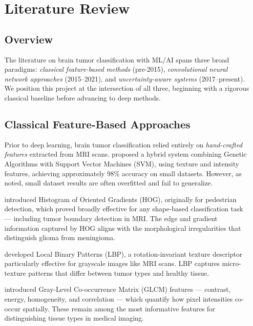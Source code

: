 \documentclass[12pt,a4paper]{article}
\begin{document}
\section{Literature Review}

\subsection{Overview}

The literature on brain tumor classification with ML/AI spans three broad paradigms: \textit{classical feature-based methods} (pre-2015), \textit{convolutional neural network approaches} (2015--2021), and \textit{uncertainty-aware systems} (2017--present). We position this project at the intersection of all three, beginning with a rigorous classical baseline before advancing to deep methods.

\subsection{Classical Feature-Based Approaches}

Prior to deep learning, brain tumor classification relied entirely on \textit{hand-crafted features} extracted from MRI scans. \citet{kharrat2010hybrid} proposed a hybrid system combining Genetic Algorithms with Support Vector Machines (SVM), using texture and intensity features, achieving approximately 98\% accuracy on small datasets. However, as \citet{usman2017brain} noted, small dataset results are often overfitted and fail to generalize.

\citet{dalal2005histograms} introduced Histogram of Oriented Gradients (HOG), originally for pedestrian detection, which proved broadly effective for any shape-based classification task — including tumor boundary detection in MRI. The edge and gradient information captured by HOG aligns with the morphological irregularities that distinguish glioma from meningioma.

\citet{ojala2002multiresolution} developed Local Binary Patterns (LBP), a rotation-invariant texture descriptor particularly effective for grayscale images like MRI scans. LBP captures micro-texture patterns that differ between tumor types and healthy tissue.

\citet{haralick1973textural} introduced Gray-Level Co-occurrence Matrix (GLCM) features — contrast, energy, homogeneity, and correlation — which quantify how pixel intensities co-occur spatially. These remain among the most informative features for distinguishing tissue types in medical imaging.
\end{document}
